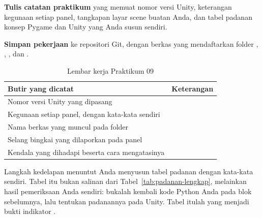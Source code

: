 \begin{praktikumbox}
\begin{langkah}
  \item \textbf{Tulis catatan praktikum} yang memuat nomor versi Unity,
        keterangan kegunaan setiap panel, tangkapan layar scene buatan Anda,
        dan tabel padanan konsep Pygame dan Unity yang Anda susun sendiri.

  \item \textbf{Simpan pekerjaan} ke repositori Git, dengan berkas
         yang mendaftarkan folder ,
        , , dan .
\end{langkah}
\end{praktikumbox}

\begin{table}[htbp]
\centering
\caption{Lembar kerja Praktikum 09}
\label{tab:lembar-praktikum-09}
{\setlength{\tabcolsep}{4pt}\footnotesize%
\begin{tabularx}{\textwidth}{@{}L{4.2cm} Y@{}}
\toprule
\headrow \textbf{Butir yang dicatat} & \textbf{Keterangan} \\
\midrule
Nomor versi Unity yang dipasang & \\[1.2em]
\addlinespace
Kegunaan setiap panel, dengan kata-kata sendiri & \\[2.4em]
\addlinespace
Nama berkas yang muncul pada folder  & \\[1.2em]
\addlinespace
Selang bingkai yang dilaporkan pada panel  & \\[1.2em]
\addlinespace
Kendala yang dihadapi beserta cara mengatasinya & \\[2.4em]
\bottomrule
\end{tabularx}}
\end{table}

\begin{catatabox}
Langkah kedelapan menuntut Anda menyusun tabel padanan dengan kata-kata
sendiri. Tabel itu bukan salinan dari Tabel~\ref{tab:padanan-lengkap}, melainkan
hasil pemeriksaan Anda sendiri: bukalah kembali kode Python Anda pada blok
sebelumnya, lalu tentukan padanannya pada Unity. Tabel itulah yang menjadi bukti
indikator .
\end{catatabox}
